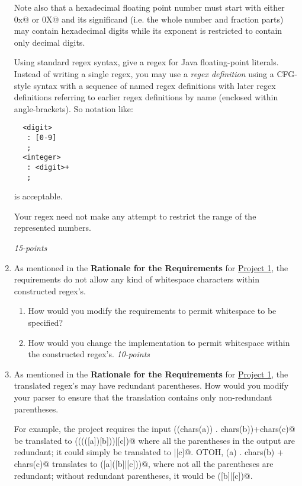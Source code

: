 \documentclass[12pt]{article}
\begin{document}
\begin{enumerate}
\begin{quote}
  \end{quote}

  Note also that a hexadecimal floating point number must start with
  either \verb@0x@ or \verb@0X@ and its significand (i.e. the whole
  number and fraction parts) may contain hexadecimal digits while its
  exponent is restricted to contain only decimal digits.

  Using standard regex syntax, give a regex for Java floating-point
  literals.  Instead of writing a single regex, you may use a \textit
  {regex definition} using a CFG-style syntax with a sequence of named
  regex definitions with later regex definitions referring to earlier
  regex definitions by name (enclosed within angle-brackets).  So
  notation like:
\begin{verbatim}
  <digit>
   : [0-9]
   ;
  <integer>
   : <digit>+
   ;
\end{verbatim}
is acceptable.

Your regex need not make any attempt to restrict the range of the
represented numbers.

\hfill\textit{15-points}

\item As mentioned in the \textbf{Rationale for the Requirements} for
  \href{../../projects/prj1/prj1.html}{Project 1}, the requirements
  do not allow any kind of whitespace characters within constructed
  regex's.
  \begin{enumerate}

  \item How would you modify the requirements to permit whitespace
    to be specified?

  \item How would you change the implementation to permit
    whitespace within the constructed regex's. \hfill\textit{10-points}

  \end{enumerate}

\item As mentioned in the \textbf{Rationale for the Requirements} for
  \href{../../projects/prj1/prj1.html}{Project 1}, the translated
  regex's may have redundant parentheses.  How would you modify your
  parser to ensure that the translation contains only non-redundant
  parentheses.

  For example, the project requires the input
  \verb@((chars(a)) . chars(b))+chars(c)@ be translated to
  \verb@(((([a])[b]))|[c])@ where all the parentheses in the
  output are redundant; it could simply be translated to
  \verb@[a][b]|[c]@.  OTOH,
  \verb@chars(a) . chars(b) + chars(c)@ translates to
  \verb@([a]([b]|[c]))@, where not all the parentheses are redundant;
  without redundant parentheses, it would be \verb@[a]([b]|[c])@.


\end{enumerate}
\end{document}
